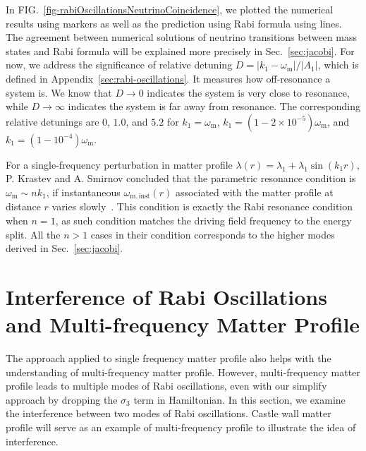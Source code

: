 \documentclass[%
reprint,
 amsmath,amssymb,
 prd,
]{revtex4-1}
\newcommand{\RD}{D}
\begin{document}
In FIG.~\ref{fig-rabiOscillationsNeutrinoCoincidence}, we plotted the numerical results using markers as well as the prediction using Rabi formula using lines. The agreement between numerical solutions of neutrino transitions between mass states and Rabi formula will be explained more precisely in Sec.~\ref{sec:jacobi}. For now, we address the significance of relative detuning $\RD = \lvert k_1 - \omega_{\mathrm m} \rvert /\lvert A_1 \rvert$,  which is defined in Appendix~\ref{sec:rabi-oscillations}. It measures how off-resonance a system is. We know that $\RD\to 0$ indicates the system is very close to resonance, while $\RD\to \infty$ indicates the system is far away from resonance. The corresponding relative detunings are $0$, $1.0$, and $5.2$ for $k_1=\omega_{\mathrm{m}}$, $k_1=(1-2\times 10^{-5})\omega_{\mathrm m}$, and $k_1=(1-10^{-4})\omega_{\mathrm m}$.


For a single-frequency perturbation in matter profile $\lambda(r) =\lambda_1 +  \lambda_1\sin(k_1 r)$, P. Krastev and A. Smirnov concluded that the parametric resonance condition is $\omega_{\mathrm{m}} \sim n k_1$, if instantaneous $\omega_{\mathrm{m,inst}}(r)$ associated with the matter profile at distance $r$ varies slowly~\cite{Krastev1989}. This condition is exactly the Rabi resonance condition when $n=1$, as such condition matches the driving field frequency to the energy split. All the $n>1$ cases in their condition corresponds to the higher modes derived in Sec.~\ref{sec:jacobi}.





\section{\label{sec:multiple}Interference of Rabi Oscillations and Multi-frequency Matter Profile}


The approach applied to single frequency matter profile also helps with the understanding of multi-frequency matter profile. However, multi-frequency matter profile leads to multiple modes of Rabi oscillations, even with our simplify approach by dropping the $\sigma_3$ term in Hamiltonian. In this section, we examine the interference between two modes of Rabi oscillations. Castle wall matter profile will serve as an example of multi-frequency profile to illustrate the idea of interference.



\end{document}
